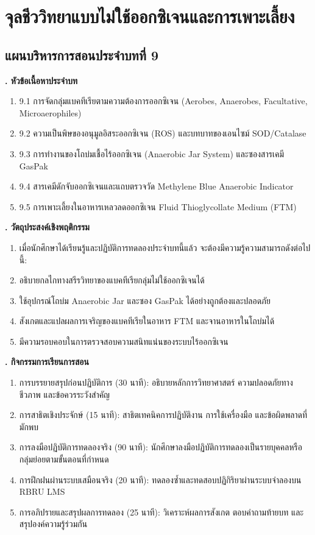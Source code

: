 \chapter{จุลชีววิทยาแบบไม่ใช้ออกซิเจนและการเพาะเลี้ยง}
\label{chap:ch09}

\section*{แผนบริหารการสอนประจำบทที่ 9}

\noindent\textbf{. หัวข้อเนื้อหาประจำบท}

\begin{enumerate}
    \item 9.1 การจัดกลุ่มแบคทีเรียตามความต้องการออกซิเจน (Aerobes, Anaerobes, Facultative, Microaerophiles)
    \item 9.2 ความเป็นพิษของอนุมูลอิสระออกซิเจน (ROS) และบทบาทของเอนไซม์ SOD/Catalase
    \item 9.3 การทำงานของโถบ่มเชื้อไร้ออกซิเจน (Anaerobic Jar System) และซองสารเคมี GasPak
    \item 9.4 สารเคมีดักจับออกซิเจนและแถบตรวจวัด Methylene Blue Anaerobic Indicator
    \item 9.5 การเพาะเลี้ยงในอาหารเหลวลดออกซิเจน Fluid Thioglycollate Medium (FTM)
\end{enumerate}

\noindent\textbf{. วัตถุประสงค์เชิงพฤติกรรม}

\begin{enumerate}
    \item เมื่อนักศึกษาได้เรียนรู้และปฏิบัติการทดลองประจำบทนี้แล้ว จะต้องมีความรู้ความสามารถดังต่อไปนี้:
    \item อธิบายกลไกทางสรีรวิทยาของแบคทีเรียกลุ่มไม่ใช้ออกซิเจนได้
    \item ใช้อุปกรณ์โถบ่ม Anaerobic Jar และซอง GasPak ได้อย่างถูกต้องและปลอดภัย
    \item สังเกตและแปลผลการเจริญของแบคทีเรียในอาหาร FTM และจานอาหารในโถบ่มได้
    \item มีความรอบคอบในการตรวจสอบความสนิทแน่นของระบบไร้ออกซิเจน
\end{enumerate}

\noindent\textbf{. กิจกรรมการเรียนการสอน}

\begin{enumerate}
    \item การบรรยายสรุปก่อนปฏิบัติการ (30 นาที): อธิบายหลักการวิทยาศาสตร์ ความปลอดภัยทางชีวภาพ และข้อควรระวังสำคัญ
    \item การสาธิตเชิงประจักษ์ (15 นาที): สาธิตเทคนิคการปฏิบัติงาน การใช้เครื่องมือ และข้อผิดพลาดที่มักพบ
    \item การลงมือปฏิบัติการทดลองจริง (90 นาที): นักศึกษาลงมือปฏิบัติการทดลองเป็นรายบุคคลหรือกลุ่มย่อยตามขั้นตอนที่กำหนด
    \item การฝึกฝนผ่านระบบเสมือนจริง (20 นาที): ทดลองซ้ำและทดสอบปฏิกิริยาผ่านระบบจำลองบน RBRU LMS
    \item การอภิปรายและสรุปผลการทดลอง (25 นาที): วิเคราะห์ผลการสังเกต ตอบคำถามท้ายบท และสรุปองค์ความรู้ร่วมกัน
\end{enumerate}

